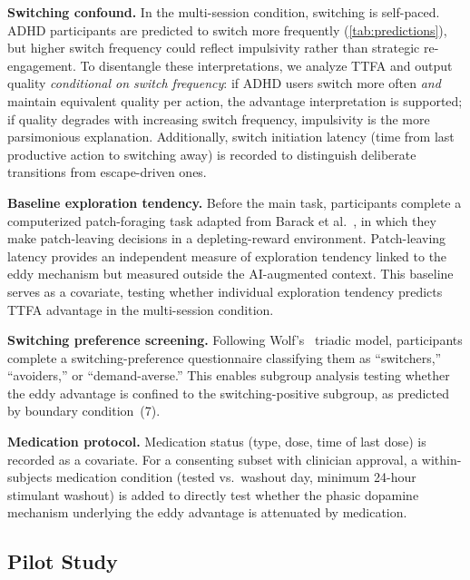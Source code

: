 \documentclass[sigconf,nonacm]{acmart}
\begin{document}
\textbf{Switching confound.} In the multi-session condition, switching is self-paced. ADHD participants are predicted to switch more frequently (\autoref{tab:predictions}), but higher switch frequency could reflect impulsivity rather than strategic re-engagement. To disentangle these interpretations, we analyze TTFA and output quality \emph{conditional on switch frequency}: if ADHD users switch more often \emph{and} maintain equivalent quality per action, the advantage interpretation is supported; if quality degrades with increasing switch frequency, impulsivity is the more parsimonious explanation. Additionally, switch initiation latency (time from last productive action to switching away) is recorded to distinguish deliberate transitions from escape-driven ones.

\textbf{Baseline exploration tendency.} Before the main task, participants complete a computerized patch-foraging task adapted from Barack et al.~\cite{barack2024}, in which they make patch-leaving decisions in a depleting-reward environment. Patch-leaving latency provides an independent measure of exploration tendency linked to the eddy mechanism but measured outside the AI-augmented context. This baseline serves as a covariate, testing whether individual exploration tendency predicts TTFA advantage in the multi-session condition.

\textbf{Switching preference screening.} Following Wolf's~\cite{wolf2025} triadic model, participants complete a switching-preference questionnaire classifying them as ``switchers,'' ``avoiders,'' or ``demand-averse.'' This enables subgroup analysis testing whether the eddy advantage is confined to the switching-positive subgroup, as predicted by boundary condition~(7).

\textbf{Medication protocol.} Medication status (type, dose, time of last dose) is recorded as a covariate. For a consenting subset with clinician approval, a within-subjects medication condition (tested vs.\ washout day, minimum 24-hour stimulant washout) is added to directly test whether the phasic dopamine mechanism underlying the eddy advantage is attenuated by medication.

\subsection{Pilot Study}
\end{document}
